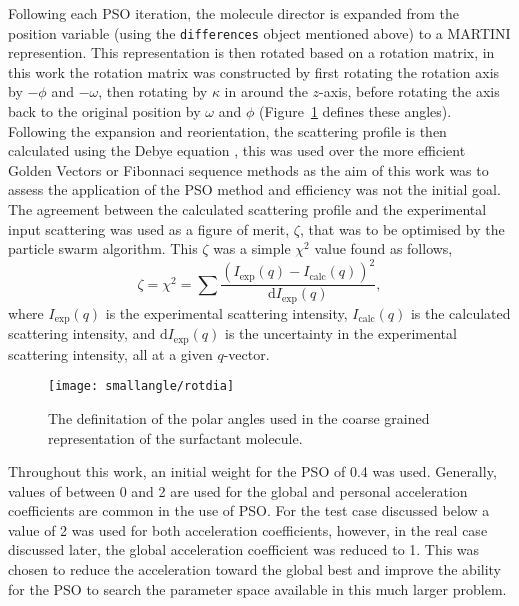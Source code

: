 Following each PSO iteration, the molecule director is expanded from the position variable (using the \texttt{differences} object mentioned above) to a MARTINI represention.
This representation is then rotated based on a rotation matrix, in this work the rotation matrix was constructed by first rotating the rotation axis by $-\phi$ and $-\omega$, then rotating by $\kappa$ in around the $z$-axis, before rotating the axis back to the original position by $\omega$ and $\phi$ \cite{evans_rotations_2001} (Figure~\ref{fig:rot} defines these angles).
Following the expansion and reorientation, the scattering profile is then calculated using the Debye equation \cite{debye_zerstreuung_1915}, this was used over the more efficient Golden Vectors \cite{watson_rapid_2013} or Fibonnaci sequence \cite{svergun_solution_1994} methods as the aim of this work was to assess the application of the PSO method and efficiency was not the initial goal.
The agreement between the calculated scattering profile and the experimental input scattering was used as a figure of merit, $\zeta$, that was to be optimised by the particle swarm algorithm.
This $\zeta$ was a simple $\chi^2$ value found as follows,
%
\begin{equation}
\zeta = \chi^2 = \sum\frac{(I_{\text{exp}}(q) - I_{\text{calc}}(q))^2}{\text{d}I_{\text{exp}}(q)},
\end{equation}
%
where $I_{\text{exp}}(q)$ is the experimental scattering intensity, $I_{\text{calc}}(q)$ is the calculated scattering intensity, and $\text{d}I_{\text{exp}}(q)$ is the uncertainty in the experimental scattering intensity, all at a given $q$-vector.
%
\begin{figure}
    \centering
    \texttt{[image: smallangle/rotdia]}
    \caption{The definitation of the polar angles used in the coarse grained representation of the surfactant molecule.}
    \label{fig:rot}
\end{figure}
%

Throughout this work, an initial weight for the PSO of 0.4 was used.
Generally, values of between 0 and 2 are used for the global and personal acceleration coefficients are common in the use of PSO.
For the test case discussed below a value of 2 was used for both acceleration coefficients, however, in the real case discussed later, the global acceleration coefficient was reduced to 1.
This was chosen to reduce the acceleration toward the global best and improve the ability for the PSO to search the parameter space available in this much larger problem.

